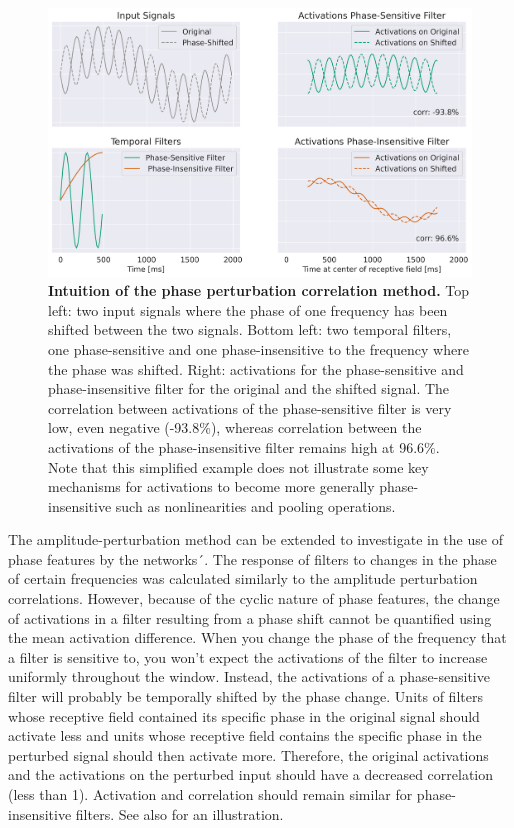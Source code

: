 \begin{figure}[h!tb]
    \centering
    \includegraphics[width=.75\linewidth]{images/phase-perturbation-corr.png}
    \caption[Phase perturbation intuition]{
\textbf{Intuition of the phase perturbation
correlation method.} Top left: two input signals
where the phase of one frequency has been shifted between the two
signals. Bottom left: two temporal filters, one phase-sensitive
and one phase-insensitive to the frequency where the phase was shifted.
Right: activations for the phase-sensitive and
phase-insensitive filter for the original and the shifted signal. The correlation between activations of the phase-sensitive filter is
very low, even negative (-93.8\%), whereas correlation between the
activations of the phase-insensitive filter remains high at 96.6\%. Note
that this simplified example does not illustrate some key mechanisms for
activations to become more generally phase-insensitive such as
nonlinearities and pooling operations.
}
\label{phase-perturbation-corr-figure}
\end{figure}


    The amplitude-perturbation method can be extended to investigate in
the use of phase features by the networks´. The response
of filters to changes in the phase of certain frequencies was calculated
similarly to the amplitude perturbation correlations. However, because
of the cyclic nature of phase features, the change of activations in a
filter resulting from a phase shift cannot be quantified using the mean
activation difference. When you change the phase of the frequency that a
filter is sensitive to, you won't expect the activations of the filter
to increase uniformly throughout the window. Instead, the activations of
a phase-sensitive filter will probably be temporally shifted by the
phase change. Units of filters whose receptive field contained its
specific phase in the original signal should activate less and units
whose receptive field contains the specific phase in the perturbed
signal should then activate more. Therefore, the original activations
and the activations on the perturbed input should have a decreased
correlation (less than 1). Activation and correlation should remain
similar for phase-insensitive filters. See also  for an illustration.

